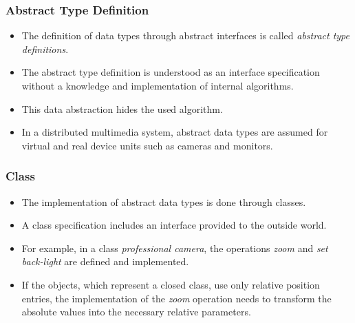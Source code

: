 \begin{multicols}{2}
	\subsubsection{Abstract Type Definition}
	\begin{itemize}
		\item The definition of data types through abstract interfaces is called \textit{abstract type definitions}. 
		\item The abstract type definition is understood as an interface specification without a knowledge and implementation of internal algorithms. 
		\item This data abstraction hides the used algorithm.
		\item In a distributed multimedia system, abstract data types are assumed for virtual and real device units such as cameras and monitors. 
	\end{itemize}
\end{multicols}



\begin{multicols}{2}
	\subsubsection{Class}
	\begin{itemize}
		\item The implementation of abstract data types is done through classes. 
		\item A class specification includes an interface provided to the outside world.
		\item For example, in a class \textit{professional camera}, the operations \textit{zoom} and \textit{set back-light} are defined and implemented. 
		\item If the objects, which represent a closed class, use only relative position entries, the implementation of the \textit{zoom} operation needs to transform the absolute values into the necessary relative parameters.
	\end{itemize}
\end{multicols}




